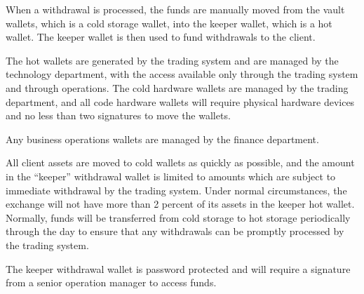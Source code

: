 When a withdrawal is processed, the funds are manually moved from the
vault wallets, which is a cold storage wallet, into the keeper wallet, which is a hot wallet.  The keeper wallet
is then used to fund withdrawals to the client.

The hot wallets are generated by the trading system and are managed by
the technology department, with the access available only through the
trading system and through operations.  The cold hardware wallets are
managed by the trading department, and all code hardware wallets will
require physical hardware devices and no less than two signatures to
move the wallets.

Any business operations wallets are managed by the finance
department.

All client assets are moved to cold wallets as quickly as possible,
and the amount in the ``keeper'' withdrawal wallet is limited to
amounts which are subject to immediate withdrawal by the trading
system.  Under normal circumstances, the exchange will not have more
than 2 percent of its assets in the keeper hot wallet.  Normally,
funds will be transferred from cold storage to hot storage periodically
through the day to ensure that any withdrawals can be
promptly processed by the trading system.

The keeper withdrawal wallet is password protected and will require a
signature from a senior operation manager to access funds.

